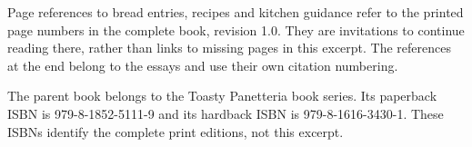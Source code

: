 \documentclass[11pt,oneside,openany]{book}
\begin{document}
Page references to bread entries, recipes and kitchen guidance refer to the printed page numbers in the complete book, revision 1.0. They are invitations to continue reading there, rather than links to missing pages in this excerpt. The references at the end belong to the essays and use their own citation numbering.

The parent book belongs to the Toasty Panetteria book series. Its paperback ISBN is 979-8-1852-5111-9 and its hardback ISBN is 979-8-1616-3430-1. These ISBNs identify the complete print editions, not this excerpt.
\clearpage
\tableofcontents
\mainmatter







\backmatter
\clearpage{}
\begingroup\small\setlength{\parskip}{0pt}\listoffigures\endgroup
\clearpage{}
\renewcommand{\bibname}{References}
\begingroup\setlength{\bibsep}{3pt}

\endgroup
\end{document}

